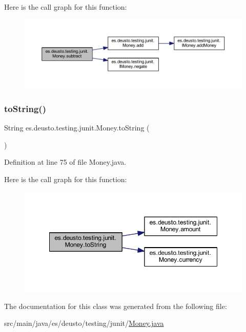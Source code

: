 Here is the call graph for this function\+:
\nopagebreak
\begin{figure}[H]
\begin{center}
\leavevmode
\includegraphics[width=350pt]{classes_1_1deusto_1_1testing_1_1junit_1_1_money_aada973cd1a31410ed2b7e5d2ae6bc2e9_cgraph}
\end{center}
\end{figure}
\mbox{\label{classes_1_1deusto_1_1testing_1_1junit_1_1_money_af9e655069123757bea0efecc4efcd638}} 
\subsubsection{\texorpdfstring{to\+String()}{toString()}}
{\footnotesize\ttfamily String es.\+deusto.\+testing.\+junit.\+Money.\+to\+String (\begin{DoxyParamCaption}{ }\end{DoxyParamCaption})}



Definition at line 75 of file Money.\+java.

Here is the call graph for this function\+:
\nopagebreak
\begin{figure}[H]
\begin{center}
\leavevmode
\includegraphics[width=348pt]{classes_1_1deusto_1_1testing_1_1junit_1_1_money_af9e655069123757bea0efecc4efcd638_cgraph}
\end{center}
\end{figure}


The documentation for this class was generated from the following file\+:\begin{DoxyCompactItemize}
\item 
src/main/java/es/deusto/testing/junit/\hyperlink{_money_8java}{Money.\+java}\end{DoxyCompactItemize}
